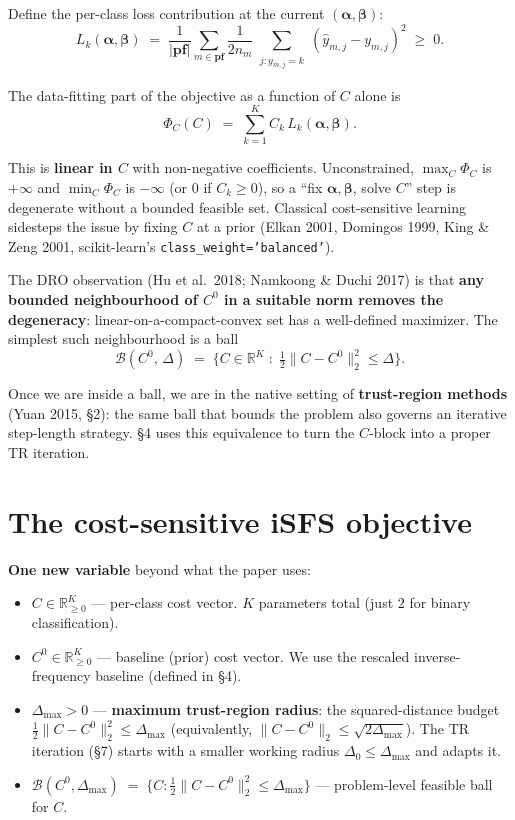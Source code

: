 \documentclass[11pt,a4paper]{article}
\begin{document}
Define the per-class loss contribution at the current $(\boldsymbol{\alpha}, \boldsymbol{\beta})$:
\[
L_k(\boldsymbol{\alpha},\boldsymbol{\beta}) \;=\; \frac{1}{|\mathbf{pf}|}\sum_{m \in \mathbf{pf}}\frac{1}{2 n_m}\!\!\sum_{\substack{j: y_{m,j} = k}}\!(\hat{y}_{m,j} - y_{m,j})^{2}\;\ge\;0.
\]

The data-fitting part of the objective as a function of $C$ alone is
\[
\Phi_C(C) \;=\; \sum_{k=1}^{K} C_k\,L_k(\boldsymbol{\alpha},\boldsymbol{\beta}).
\]

This is \textbf{linear in $C$} with non-negative coefficients. Unconstrained, $\max_C \Phi_C$ is $+\infty$ and $\min_C \Phi_C$ is $-\infty$ (or $0$ if $C_k \ge 0$), so a ``fix $\boldsymbol{\alpha},\boldsymbol{\beta}$, solve $C$'' step is degenerate without a bounded feasible set. Classical cost-sensitive learning sidesteps the issue by fixing $C$ at a prior (Elkan 2001, Domingos 1999, King \& Zeng 2001, scikit-learn's \texttt{class\_weight='balanced'}).

The DRO observation (Hu et al.\ 2018; Namkoong \& Duchi 2017) is that \textbf{any bounded neighbourhood of $C^0$ in a suitable norm removes the degeneracy}: linear-on-a-compact-convex set has a well-defined maximizer. The simplest such neighbourhood is a ball
\[
\mathcal B(C^0,\,\Delta) \;=\; \Big\{ C \in \mathbb{R}^K \;:\; \tfrac12\|C - C^0\|_2^2 \le \Delta \Big\}.
\]

Once we are inside a ball, we are in the native setting of \textbf{trust-region methods} (Yuan 2015, \S 2): the same ball that bounds the problem also governs an iterative step-length strategy. \S 4 uses this equivalence to turn the $C$-block into a proper TR iteration.

\section{The cost-sensitive iSFS objective}

\textbf{One new variable} beyond what the paper uses:
\begin{itemize}[leftmargin=*,itemsep=2pt]
  \item $C \in \mathbb{R}^K_{\ge 0}$ --- per-class cost vector. $K$ parameters total (just $2$ for binary classification).
  \item $C^0 \in \mathbb{R}^K_{\ge 0}$ --- baseline (prior) cost vector. We use the rescaled inverse-frequency baseline (defined in \S 4).
  \item $\Delta_{\max} > 0$ --- \textbf{maximum trust-region radius}: the squared-distance budget $\tfrac12\|C - C^0\|_2^2 \le \Delta_{\max}$ (equivalently, $\|C - C^0\|_2 \le \sqrt{2\Delta_{\max}}$). The TR iteration (\S 7) starts with a smaller working radius $\Delta_0 \le \Delta_{\max}$ and adapts it.
  \item $\mathcal B(C^0,\Delta_{\max}) \;=\; \{C : \tfrac12\|C-C^0\|_2^2 \le \Delta_{\max}\}$ --- problem-level feasible ball for $C$.
\end{itemize}
\end{document}
